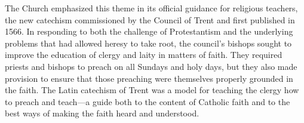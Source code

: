 The Church emphasized this theme in its official guidance for religious
teachers, the new catechism  commissioned by the
Council of Trent and first published in 1566.%
    \Autocites[]{Catholic:Catechismus1614}{NewCatholic}
In responding to both the challenge of Protestantism and the underlying problems
that had allowed heresy to take root, the council's bishops sought to improve
the education of clergy and laity in matters of faith.%
    \Autocite[]{NewCatholic}
They required priests and bishops to preach on all Sundays and holy days, but
they also made provision to ensure that those preaching were themselves properly
grounded in the faith.
The Latin catechism of Trent was a model for teaching the clergy how to preach
and teach---a guide both to the content of Catholic faith and to the best ways
of making the faith heard and understood.

